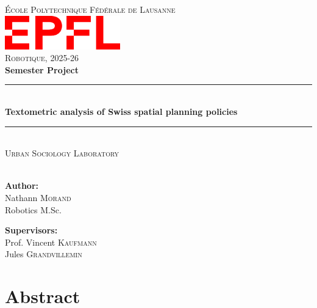 \documentclass[a4paper, 11 pt]{article}
\begin{document}
\thispagestyle{empty}
\begin{center}
    \newcommand{\HRule}{\rule{\linewidth}{0.5mm}}
    
    \textsc{\LARGE École Polytechnique Fédérale de Lausanne}\\[0.5cm]
    \includegraphics[width=5cm]{Figures/epfl_red.png}\\[0.5cm]
    \LARGE{\textsc{Robotique, 2025-26}}\\[0.5cm]
    \huge{\textbf{Semester Project}}
    
    \HRule \\[0.4cm]
    {\huge \bfseries Textometric analysis of Swiss spatial planning policies}\\[0.1cm]
    \HRule \\[0.5cm]
    \LARGE{\textsc{Urban Sociology Laboratory} \\
    }\\[0.5cm]
    
    \vspace{5mm}
    \vspace{15mm}
    
    \begin{minipage}{2in} \Large
    \textbf{Author:}\\
    Nathann \textsc{Morand}\\
    Robotics M.Sc.
    \end{minipage}
    \hfill
    \begin{minipage}{2.5in} \Large
    \textbf{Supervisors:}\\
    Prof. Vincent \textsc{Kaufmann} \\
    Jules \textsc{Grandvillemin} \\
    \end{minipage}
\end{center}

{ %

\newpage
\section*{Abstract}

\newpage
}
\newpage
\renewcommand{\contentsname}{Table of Contents} 
{
  \hypersetup{linkcolor=black}
  \tableofcontents
}
\newpage

 









\newpage
 

\end{document}
